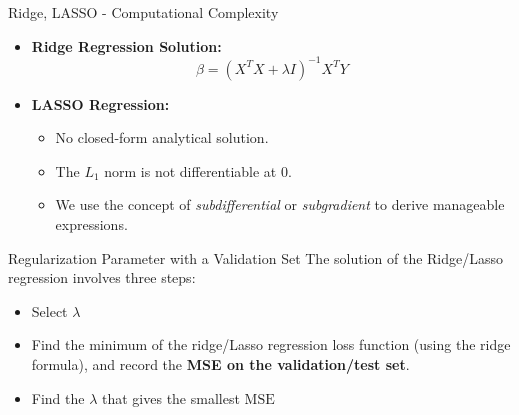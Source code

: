 \begin{frame}{Ridge, LASSO - Computational Complexity}
    \begin{itemize}
        \item \textbf{Ridge Regression Solution:}
        \[
            \beta = (X^T X + \lambda I)^{-1} X^T Y
        \]
        
        \item \textbf{LASSO Regression:}
        \begin{itemize}
            \item No closed-form analytical solution.
            \item The \( L_1 \) norm is not differentiable at 0.
            \item We use the concept of \textit{subdifferential} or \textit{subgradient} to derive manageable expressions.

        \end{itemize}
    \end{itemize}
\end{frame}


\begin{frame}{Regularization Parameter with a Validation Set}
    The solution of the Ridge/Lasso regression involves three steps:
    \begin{itemize}
        \item Select \( \lambda \)
        \item Find the minimum of the ridge/Lasso regression loss function (using the ridge formula), and record the \textbf{MSE on the validation/test set}.
        \item Find the \( \lambda \) that gives the smallest \( \text{MSE} \)
    \end{itemize}
\end{frame}


